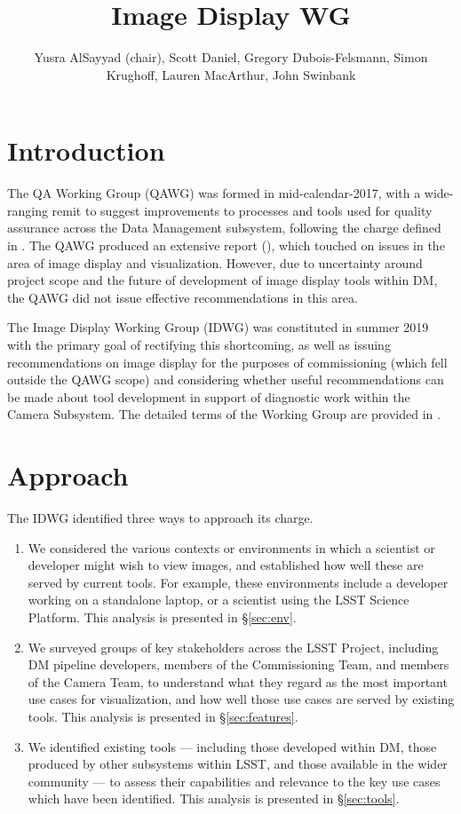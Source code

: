 \documentclass[DM,authoryear,toc]{lsstdoc}
\title{Image Display WG}
\author{%
Yusra AlSayyad (chair),
Scott Daniel,
Gregory Dubois-Felsmann,
Simon Krughoff,
Lauren MacArthur,
John Swinbank
}
\date{\vcsDate}
\begin{document}
\maketitle

\section{Introduction}

The QA Working Group (QAWG) was formed in mid-calendar-2017, with a wide-ranging remit to suggest improvements to processes and tools used for quality assurance across the Data Management subsystem, following the charge defined in .
The QAWG produced an extensive report (), which touched on issues in the area of image display and visualization.
However, due to uncertainty around project scope and the future of development of image display tools within DM, the QAWG did not issue effective recommendations in this area.

The Image Display Working Group (IDWG) was constituted in summer 2019 with the primary goal of rectifying this shortcoming, as well as issuing recommendations on image display for the purposes of commissioning (which fell outside the QAWG scope) and considering whether useful recommendations can be made about tool development in support of diagnostic work within the Camera Subsystem.
The detailed terms of the Working Group are provided in .

\section{Approach}

The IDWG identified three ways to approach its charge.

\begin{enumerate}

  \item{
    We considered the various contexts or environments in which a scientist or developer might wish to view images, and established how well these are served by current tools.
    For example, these environments include a developer working on a standalone laptop, or a scientist using the LSST Science Platform.
    This analysis is presented in \S\ref{sec:env}.
  }

  \item{
    We surveyed groups of key stakeholders across the LSST Project, including DM pipeline developers, members of the Commissioning Team, and members of the Camera Team, to understand what they regard as the most important use cases for visualization, and how well those use cases are served by existing tools.
    This analysis is presented in \S\ref{sec:features}.
  }

  \item{
    We identified existing tools --- including those developed within DM, those produced by other subsystems within LSST, and those available in the wider community --- to assess their capabilities and relevance to the key use cases which have been identified.
    This analysis is presented in \S\ref{sec:tools}.
  }

\end{enumerate}
\end{document}
